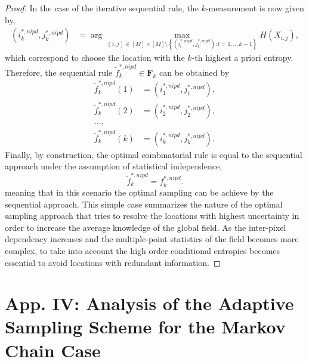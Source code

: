 \begin{proof}
In the case of the iterative sequential rule, %
the $k$-measurement is now given by,
\begin{align}\label{eq_proofB_3_PI}
	(i^{*,nipd}_k,j^{*,nipd}_k) 	&= \arg \max_{(i,j)\in [M]\times [M] \setminus \left\{(i^{*,nipd}_l,j^{*,nipd}_l): l=1,..,k-1\right\}} H(X_{i,j}),
\end{align}
which correspond to choose the location with the $k$-th highest a priori entropy. Therefore, %
the sequential rule $\tilde{f}^{*,nipd}_k \in \mathbf{F}_k$ can be obtained by%
\begin{align}\label{eq_proofB_4_PI}
\tilde{f}^{*,nipd}_k(1) &=(i^{*,nipd}_1,j^{*,nipd}_1), \\ \nonumber 
\tilde{f}^{*,nipd}_k(2) &=(i^{*,nipd}_2,j^{*,nipd}_2), \\ \nonumber 
                                       ...,  \\ \nonumber
\tilde{f}^{*,nipd}_k(k) &=(i^{*,nipd}_k,j^{*,nipd}_k).
\end{align}
Finally, by construction, the optimal combinatorial rule is equal to the sequential approach under the assumption of statistical independence,
\begin{equation}\label{eq_proofB_5_PI}
	\tilde{f}^{*,nipd}_k  = f^{*,nipd}_{k}.
\end{equation}
meaning that in this scenario the optimal sampling can be achieve by the sequential approach. This simple case summarizes the nature of the optimal sampling approach that tries to resolve the locations with highest uncertainty in order to increase the average knowledge of the global field. As the inter-pixel dependency increases and the multiple-point statistics of the field becomes more complex, to take into account the high order conditional entropies becomes essential to avoid locations with redundant information.

\end{proof}



\section{App. IV: Analysis of the Adaptive Sampling Scheme for the Markov Chain Case}
\label{sec:ap_markov_anal_PI}

